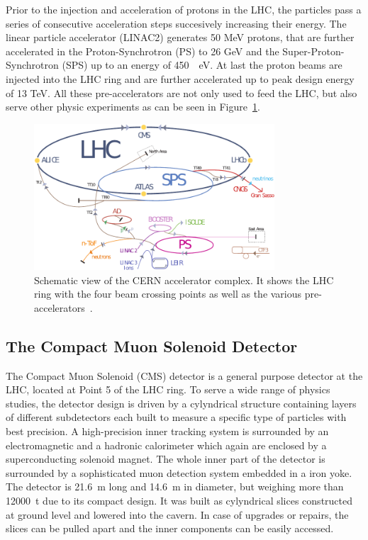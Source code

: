 Prior to the injection and acceleration of protons in the LHC, the particles
pass a series of consecutive acceleration steps succesively increasing their
energy. The linear particle accelerator (LINAC2) generates 50 MeV protons, that
are further accelerated in the Proton-Synchrotron (PS) to 26 GeV and
the Super-Proton-Synchrotron (SPS) up to an energy of \SI{450}{\giga
\electronvolt}. At last the proton beams are injected into the LHC ring and are
further accelerated up to peak design energy of 13 TeV. All these
pre-accelerators are not only used to feed the LHC, but also serve other physic
experiments as can be seen in Figure~\ref{fig:lhc_complex}.

\begin{figure}[htp]
    \centering
    \includegraphics[width=0.8\textwidth]{figures/cms_detector/lhc_accelerator_chain.pdf}
    \caption[CERN accelerator complex]{Schematic view of the CERN
        accelerator complex. It shows the LHC ring  with the four beam crossing
        points as well as the various pre-accelerators~\cite{LHC:COMPLEX}.}
    \label{fig:lhc_complex}
\end{figure}

\subsection{The Compact Muon Solenoid Detector}

The Compact Muon Solenoid (CMS) detector is a general purpose detector at the
LHC, located at Point 5 of the LHC ring. To serve a wide range of physics
studies, the detector design is driven by a cylyndrical structure containing
layers of different subdetectors each built to measure a specific type of
particles with best precision. A high-precision inner tracking system is
surrounded by an electromagnetic and a hadronic calorimeter which again are
enclosed by a superconducting solenoid magnet. The whole inner part of the
detector is surrounded by a sophisticated muon detection system embedded in a
iron yoke. The detector is \SI{21.6}{\meter} long and \SI{14.6}{\meter} in
diameter, but weighing more than \SI{12000}{\tonne} due to its compact design.
It was built as cylyndrical slices constructed at ground level and lowered into
the cavern. In case of upgrades or repairs, the slices can be pulled apart and
the inner components can be easily accessed.

